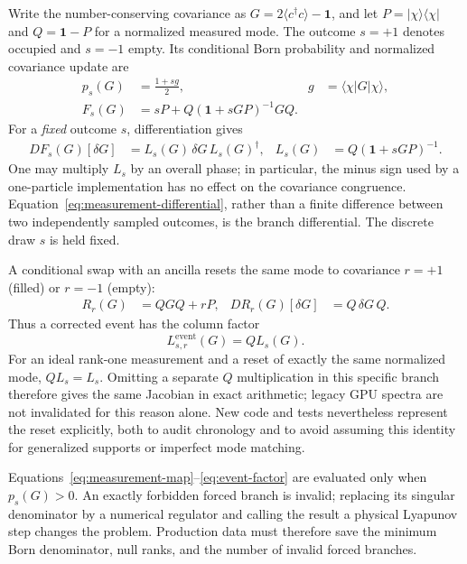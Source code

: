 \documentclass[aps,prb,onecolumn,nofootinbib,superscriptaddress]{revtex4-2}
\newcommand{\I}{\mathbf{1}}
\newcommand{\ket}[1]{\lvert #1\rangle}
\newcommand{\bra}[1]{\langle #1\rvert}
\newcommand{\ketbra}[2]{\lvert #1\rangle\!\langle #2\rvert}
\begin{document}
Write the number-conserving covariance as
$G=2\langle c^\dagger c\rangle-\I$, and let
$P=\ketbra{\chi}{\chi}$ and $Q=\I-P$ for a normalized measured mode.
The outcome $s=+1$ denotes occupied and $s=-1$ empty.  Its conditional Born
probability and normalized covariance update are
\begin{align}
 p_s(G)&=\frac{1+s g}{2},
 &g&=\bra{\chi}G\ket{\chi},
 \label{eq:born}\\
 F_s(G)&=sP+Q(\I+sGP)^{-1}GQ .
 \label{eq:measurement-map}
\end{align}
For a \emph{fixed} outcome $s$, differentiation gives
\begin{align}
 D F_s(G)[\delta G]
 &=L_s(G)\,\delta G\,L_s(G)^\dagger,
 &L_s(G)&=Q(\I+sGP)^{-1}.
 \label{eq:measurement-differential}
\end{align}
One may multiply $L_s$ by an overall phase; in particular, the minus sign used
by a one-particle implementation has no effect on the covariance congruence.
Equation~\eqref{eq:measurement-differential}, rather than a finite difference
between two independently sampled outcomes, is the branch differential.  The
discrete draw $s$ is held fixed.

A conditional swap with an ancilla resets the same mode to covariance
$r=+1$ (filled) or $r=-1$ (empty):
\begin{align}
 R_r(G)&=QGQ+rP,
 &D R_r(G)[\delta G]&=Q\,\delta G\,Q .
 \label{eq:reset-differential}
\end{align}
Thus a corrected event has the column factor
\begin{equation}
 L_{s,r}^{\mathrm{event}}(G)=Q L_s(G).
 \label{eq:event-factor}
\end{equation}
For an ideal rank-one measurement and a reset of exactly the same normalized
mode, $QL_s=L_s$.  Omitting a separate $Q$ multiplication in this specific
branch therefore gives the same Jacobian in exact arithmetic; legacy GPU
spectra are not invalidated for this reason alone.  New code and tests
nevertheless represent the reset explicitly, both to audit chronology and to
avoid assuming this identity for generalized supports or imperfect mode
matching.

Equations~\eqref{eq:measurement-map}--\eqref{eq:event-factor} are evaluated
only when $p_s(G)>0$.  An exactly forbidden forced branch is invalid; replacing
its singular denominator by a numerical regulator and calling the result a
physical Lyapunov step changes the problem.  Production data must therefore
save the minimum Born denominator, null ranks, and the number of invalid forced
branches.
\end{document}
